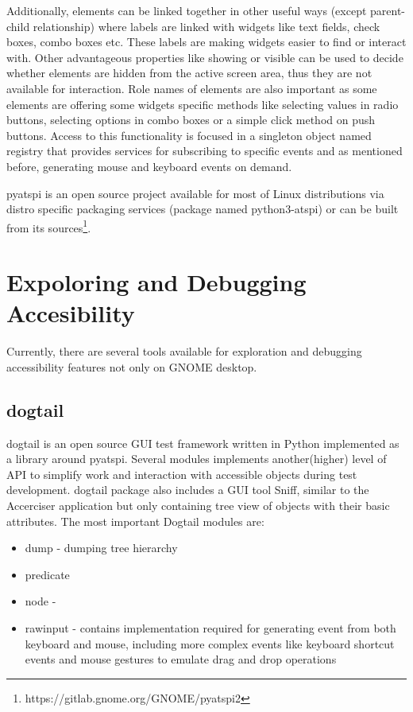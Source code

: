 Additionally, elements can be linked together in other useful ways (except parent-child relationship) where labels are linked with widgets like text fields, check boxes, combo boxes etc. These labels are making widgets easier to find or interact with. Other advantageous properties like showing or visible can be used to decide whether elements are hidden from the active screen area, thus they are not available for interaction. Role names of elements are also important as some elements are offering some widgets specific methods like selecting values in radio buttons, selecting options in combo boxes or a simple click method on push buttons. Access to this functionality is focused in a singleton object named registry that provides services for subscribing to specific events and as mentioned before, generating mouse and keyboard events on demand.

pyatspi is an open source project available for most of Linux distributions via distro specific packaging services (package named python3-atspi) or can be built from its sources\footnote{https://gitlab.gnome.org/GNOME/pyatspi2}.

\section{Expoloring and Debugging Accesibility}
Currently, there are several tools available for exploration and debugging accessibility features not only on GNOME desktop. 
\subsection{dogtail}
dogtail is an open source GUI test framework written in Python implemented as a library around pyatspi. Several modules implements another(higher) level of API to simplify work and interaction with accessible objects during test development. dogtail package also includes a GUI tool Sniff, similar to the Accerciser application but only containing tree view of objects with their basic attributes.
The most important Dogtail modules are:

\begin{itemize}
    \item dump - dumping tree hierarchy
    \item predicate 
    \item node - 
    \item rawinput - contains implementation required for generating event from both keyboard and mouse, including more complex events like keyboard shortcut events and mouse gestures to emulate drag and drop operations  
\end{itemize}

